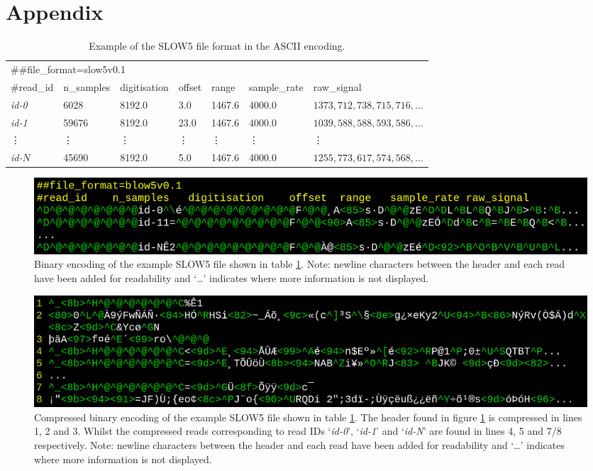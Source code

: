 \section{Appendix}

\begin{table}[h!]
    \caption{Example of the SLOW5 file format in the ASCII encoding.\label{tab:slow5}}
    \begin{tabular}{|*{7}{l}|}
        \hline
        \multicolumn{7}{|l|}{\#\#file\_format=slow5v0.1} \\
        \#read\_id & n\_samples & digitisation & offset & range & sample\_rate & raw\_signal \\
            \textit{id-0} & 6028 & 8192.0 & 3.0 & 1467.6 & 4000.0 & $1373,712,738,715,716,\dots$ \\
                    \textit{id-1} & 59676 & 8192.0 & 23.0 & 1467.6 & 4000.0 & $1039,588,588,593,586,\dots$ \\
                            \; \vdots & \; \vdots & \;\; \vdots & \; \vdots & \;\; \vdots & \;\; \vdots & \hspace{1cm} \vdots \\
                                    \textit{id-$N$} & 45690 & 8192.0 & 5.0 & 1467.6 & 4000.0 & $1255,773,617,574,568,\dots$ \\

        \hline
    \end{tabular}
\end{table}

\begin{figure}[h!]
	\includegraphics[width=1.5\linewidth]{blow5_nonum.png}
    \caption{Binary encoding of the example SLOW5 file shown in table \ref{tab:slow5}. Note: newline characters between the header and each read have been added for readability and `\dots' indicates where more information is not displayed.}
	\label{tab:blow5}
\end{figure}

\begin{figure}[h!]
	\includegraphics[width=1.5\linewidth]{blow5gz_new.png}
    \caption{Compressed binary encoding of the example SLOW5 file shown in table \ref{tab:slow5}. The header found in figure \ref{tab:blow5} is compressed in lines 1, 2 and 3. Whilst the compressed reads corresponding to read IDs `\textit{id-0}', `\textit{id-1}' and `\textit{id-N}' are found in lines 4, 5 and 7/8 respectively. Note: newline characters between the header and each read have been added for readability and `\dots' indicates where more information is not displayed.}
	\label{tab:blow5gz}
\end{figure}
